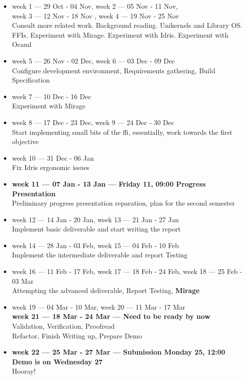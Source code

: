 \documentclass[a4paper, 12pt, oneside]{report}
\begin{document}
\begin{itemize}

	\item week 1 --- 29 Oct - 04 Nov,
	      week 2 --- 05 Nov - 11 Nov, \\
	      week 3 --- 12 Nov - 18 Nov ,
	      week 4 --- 19 Nov - 25 Nov \\
	      Consult more related work.
	      Background reading.
	      Unikernels and Library OS. \\
	      FFIs.
	      Experiment with Mirage.
	      Experiment with Idris.
	      Experiment with Ocaml

	\item week 5 --- 26 Nov - 02 Dec,
	      week 6 --- 03 Dec - 09 Dec \\
	      Configure development environment,
	      Requirements gathering,
	      Build Specification
	\item week 7 --- 10 Dec - 16 Dec \\
	      Experiment with Mirage
	\item week 8 --- 17 Dec - 23 Dec,
	      week 9 --- 24 Dec - 30 Dec \\
	      Start implementing small bits
	      of the ffi, essentially,
	      work towards the first objective
	\item week 10 --- 31 Dec - 06 Jan \\ Fix Idris ergonomic issues
	\item \textbf{week 11 --- 07 Jan - 13 Jan ---
		      Friday 11, 09:00
		      Progress Presentation} \\ Preliminary progress presentation
	      reparation, plan for the second semester
	\item week 12 --- 14 Jan - 20 Jan,
	      week 13 --- 21 Jan - 27 Jan \\
	      Implement basic deliverable
	      and start writing
	      the report
	\item week 14 --- 28 Jan - 03 Feb,
	      week 15 --- 04 Feb - 10 Feb \\ Implement the intermediate
	      deliverable and report Testing
	\item week 16 --- 11 Feb - 17 Feb,
	      week 17 --- 18 Feb - 24 Feb,
	      week 18 --- 25 Feb - 03 Mar \\ Attempting the advanced
	      deliverable, Report Testing, \textbf{Mirage}
	\item week 19 --- 04 Mar - 10 Mar,
	      week 20 --- 11 Mar - 17 Mar \\
	      \textbf{week 21 --- 18 Mar - 24 Mar ---
		      Need to be ready by now} \\
	      Validation,
	      Verification,
	      Proofread \\
	      Refactor,
	      Finish Writing up,
	      Prepare Demo
	\item \textbf{week 22 --- 25 Mar - 27 Mar ---
		      Submission Monday 25, 12:00
		      Demo is on Wednesday 27} \\ Hooray!

\end{itemize}
\end{document}
